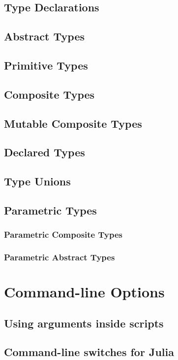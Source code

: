     \section{Type Declarations}
    \section{Abstract Types}
    \section{Primitive Types}
    \section{Composite Types}
    \section{Mutable Composite Types}
    \section{Declared Types}
    \section{Type Unions}
    \section{Parametric Types}
    \subsection{Parametric Composite Types}
    \subsection{Parametric Abstract Types}
\chapter{Command-line Options}
    \section{Using arguments inside scripts}
    \section{Command-line switches for Julia}




